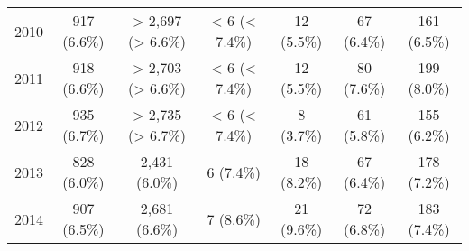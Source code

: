 \documentclass{article}
\begin{document}
\begin{table}[htbp]
\begin{longtable}{l*{6}{c}}
  2010                                                  &           917 (6.6\%)           &        > 2,697 (> 6.6\%)        &          < 6 (< 7.4\%)          &            12 (5.5\%)           &            67 (6.4\%)           &           161 (6.5\%)           \\
  2011                                                  &           918 (6.6\%)           &        > 2,703 (> 6.6\%)        &          < 6 (< 7.4\%)          &            12 (5.5\%)           &            80 (7.6\%)           &           199 (8.0\%)           \\
  2012                                                  &           935 (6.7\%)           &        > 2,735 (> 6.7\%)        &          < 6 (< 7.4\%)          &            8 (3.7\%)            &            61 (5.8\%)           &           155 (6.2\%)           \\
  2013                                                  &           828 (6.0\%)           &          2,431 (6.0\%)          &            6 (7.4\%)            &            18 (8.2\%)           &            67 (6.4\%)           &           178 (7.2\%)           \\
  2014                                                  &           907 (6.5\%)           &          2,681 (6.6\%)          &            7 (8.6\%)            &            21 (9.6\%)           &            72 (6.8\%)           &           183 (7.4\%)           \\

\bottomrule
\end{longtable}
\label{table:mr}

\end{table}
\end{document}
